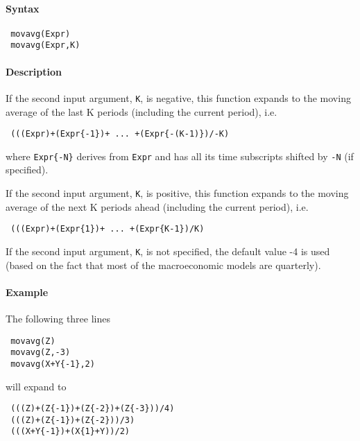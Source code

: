 


	\paragraph{Syntax}
 
 \begin{verbatim}
 movavg(Expr)
 movavg(Expr,K)
 \end{verbatim}
 
 \paragraph{Description}
 
 If the second input argument, \texttt{K}, is negative, this function
 expands to the moving average of the last K periods (including the
 current period), i.e.
 
 \begin{verbatim}
 (((Expr)+(Expr{-1})+ ... +(Expr{-(K-1)})/-K)
 \end{verbatim}
 
 where \texttt{Expr\{-N\}} derives from \texttt{Expr} and has all its
 time subscripts shifted by \texttt{-N} (if specified).
 
 If the second input argument, \texttt{K}, is positive, this function
 expands to the moving average of the next K periods ahead (including the
 current period), i.e.
 
 \begin{verbatim}
 (((Expr)+(Expr{1})+ ... +(Expr{K-1})/K)
 \end{verbatim}
 
 If the second input argument, \texttt{K}, is not specified, the default
 value -4 is used (based on the fact that most of the macroeconomic
 models are quarterly).
 
 \paragraph{Example}
 
 The following three lines
 
 \begin{verbatim}
 movavg(Z)
 movavg(Z,-3)
 movavg(X+Y{-1},2)
 \end{verbatim}
 
 will expand to
 
 \begin{verbatim}
 (((Z)+(Z{-1})+(Z{-2})+(Z{-3}))/4)
 (((Z)+(Z{-1})+(Z{-2}))/3)
 (((X+Y{-1})+(X{1}+Y))/2)
 \end{verbatim}


